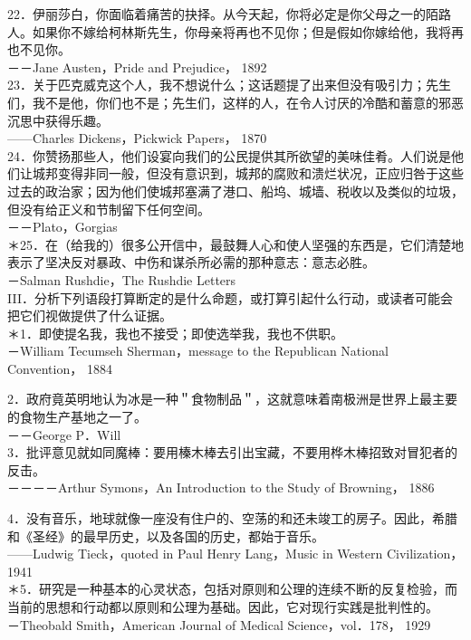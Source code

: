 22．伊丽莎白，你面临着痛苦的抉择。从今天起，你将必定是你父母之一的陌路人。如果你不嫁给柯林斯先生，你母亲将再也不见你；但是假如你嫁给他，我将再也不见你。\\
－－Jane Austen，Pride and Prejudice， 1892\\
23．关于匹克威克这个人，我不想说什么；这话题提了出来但没有吸引力；先生们，我不是他，你们也不是；先生们，这样的人，在令人讨厌的冷酷和蓄意的邪恶沉思中获得乐趣。\\
——Charles Dickens，Pickwick Papers， 1870\\
24．你赞扬那些人，他们设宴向我们的公民提供其所欲望的美味佳肴。人们说是他们让城邦变得非同一般，但没有意识到，城邦的腐败和溃烂状况，正应归咎于这些过去的政治家；因为他们使城邦塞满了港口、船坞、城墙、税收以及类似的垃圾，但没有给正义和节制留下任何空间。\\
－－Plato，Gorgias\\
＊25．在（给我的）很多公开信中，最鼓舞人心和使人坚强的东西是，它们清楚地表示了坚决反对暴政、中伤和谋杀所必需的那种意志：意志必胜。\\
－Salman Rushdie，The Rushdie Letters\\
III．分析下列语段打算断定的是什么命题，或打算引起什么行动，或读者可能会把它们视做提供了什么证据。\\
＊1．即使提名我，我也不接受；即使选举我，我也不供职。\\
－William Tecumseh Sherman，message to the Republican National Convention， 1884

2．政府竟英明地认为冰是一种＂食物制品＂，这就意味着南极洲是世界上最主要的食物生产基地之一了。\\
－－George P．Will\\
3．批评意见就如同魔棒：要用榛木棒去引出宝藏，不要用桦木棒招致对冒犯者的反击。\\
－－－－Arthur Symons，An Introduction to the Study of Browning， 1886

4．没有音乐，地球就像一座没有住户的、空荡的和还未竣工的房子。因此，希腊和《圣经》的最早历史，以及各国的历史，都始于音乐。\\
——Ludwig Tieck，quoted in Paul Henry Lang，Music in Western Civilization， 1941\\
＊5．研究是一种基本的心灵状态，包括对原则和公理的连续不断的反复检验，而当前的思想和行动都以原则和公理为基础。因此，它对现行实践是批判性的。\\
－Theobald Smith，American Journal of Medical Science，vol．178， 1929

